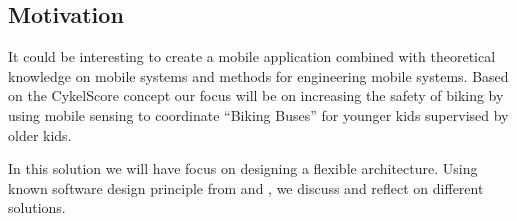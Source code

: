\subsection{Motivation} It could be interesting to create a mobile application combined with theoretical knowledge on mobile systems and methods for engineering mobile systems. Based on the CykelScore concept our focus will be on increasing the safety of biking by using mobile sensing to coordinate “Biking Buses” for younger kids supervised by older kids.   

 In this solution we will have focus on designing a flexible architecture. Using known software design principle from \cite{Bass} and \cite{Baerbak10}, we discuss and reflect on different solutions.
 
 \iffalse
\begin{defi}[\textbf{Software engineering}]
Concerned with developing and maintaining software systems that behave reliably and efficiently, are affordable to develop and maintain,
and satisfy all the requirements that customers have defined for them. [ACM]
\end{defi}


\begin{defi}[\textbf{Mobile systems}]
Mobile systems covers software systems that run on computers that are expected to be transported during normal usage. Systems depend on innovations in mobile
communications and mobile hardware.
\end{defi}


\begin{defi}[\textbf{Mobile sensing}]
Mobile sensing is the use of mobile devices for sensing and learning physical and social phenomenon and using such information for
informing, sharing and persuasion among humans.
\end{defi}

\fi

